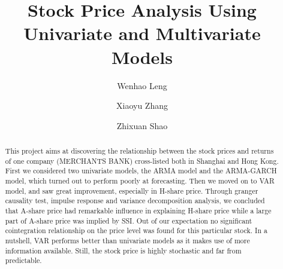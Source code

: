 \documentclass[aps,pre,12pt,preprint,onecolumn,showpacs,showkeys]{revtex4-1}
\begin{document}
\title{\bf Stock Price Analysis Using Univariate and Multivariate Models\vspace{15mm}}
\author{Wenhao Leng\vspace{2mm}}
\author{Xiaoyu Zhang\vspace{2mm}}
\author{Zhixuan Shao\vspace{2mm}}
\affiliation{ \vspace{2mm}}

\begin{abstract}
    \vspace{5mm}
    \begin{spacing}{1.5}
    
    This project aims at discovering the relationship between the stock prices and returns of one company (MERCHANTS BANK) cross-listed both in Shanghai and Hong Kong. First we considered two univariate models, the ARMA model and the ARMA-GARCH model, which turned out to perform poorly at forecasting. Then we moved on to VAR model, and saw great improvement, especially in H-share price. Through granger causality test, impulse response and variance decomposition analysis, we concluded that A-share price had remarkable influence in explaining H-share price while a large part of A-share price was implied by SSI. Out of our expectation no significant cointegration relationship on the price level was found for this particular stock. In a nutshell, VAR performs better than univariate models as it makes use of more information available. Still, the stock price is highly stochastic and far from predictable.
\end{spacing}
\end{abstract}
\end{document}
